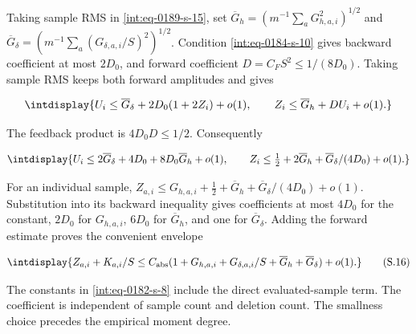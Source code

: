 
Taking sample RMS in \eqref{int:eq-0189-s-15}, set \(\overline G_h=(m^{-1}\sum_aG_{h,\allowbreak a,\allowbreak i}^2)^{1/2}\) and \(\overline G_\delta=(m^{-1}\sum_a(G_{\delta,\allowbreak a,\allowbreak i}/S)^2)^{1/2}\). Condition \eqref{int:eq-0184-s-10} gives backward coefficient at most \(2D_0\), and forward coefficient \(D=C_FS^2\le1/(8D_0)\). Taking sample RMS keeps both forward amplitudes and gives


\begingroup\renewcommand{\theHequation}{intdisplay.386}
\begin{equation*}
\intdisplay{
U_i\le\overline G_\delta+2D_0(1+2Z_i)+o(1),\qquad
Z_i\le\overline G_h+DU_i+o(1).
}
\end{equation*}
\endgroup


The feedback product is \(4D_0D\le1/2\). Consequently


\begingroup\renewcommand{\theHequation}{intdisplay.387}
\begin{equation*}
\intdisplay{
U_i\le2\overline G_\delta+4D_0+8D_0\overline G_h+o(1),\qquad
Z_i\le\tfrac12+2\overline G_h+
                      \overline G_\delta/(4D_0)+o(1).
}
\end{equation*}
\endgroup


For an individual sample, \(Z_{a,\allowbreak i}\le G_{h,\allowbreak a,\allowbreak i}+\tfrac12+\overline G_h+ \overline G_\delta/(4D_0)+o(1)\). Substitution into its backward inequality gives coefficients at most \(4D_0\) for the constant, \(2D_0\) for \(G_{h,\allowbreak a,\allowbreak i}\), \(6D_0\) for \(\overline G_h\), and one for \(\overline G_\delta\). Adding the forward estimate proves the convenient envelope


\begingroup\renewcommand{\theHequation}{intdisplay.388}
\begin{equation}
\intdisplay{
Z_{a,i}+K_{a,i}/S\le C_{\rm abs}
(1+G_{h,a,i}+G_{\delta,a,i}/S+
                  \overline G_h+\overline G_\delta)+o(1).
}
\tag{S.16}
\label{int:eq-0190-s-16}
\end{equation}
\endgroup


The constants in \eqref{int:eq-0182-s-8} include the direct evaluated-sample term. The coefficient is independent of sample count and deletion count. The smallness choice precedes the empirical moment degree.



